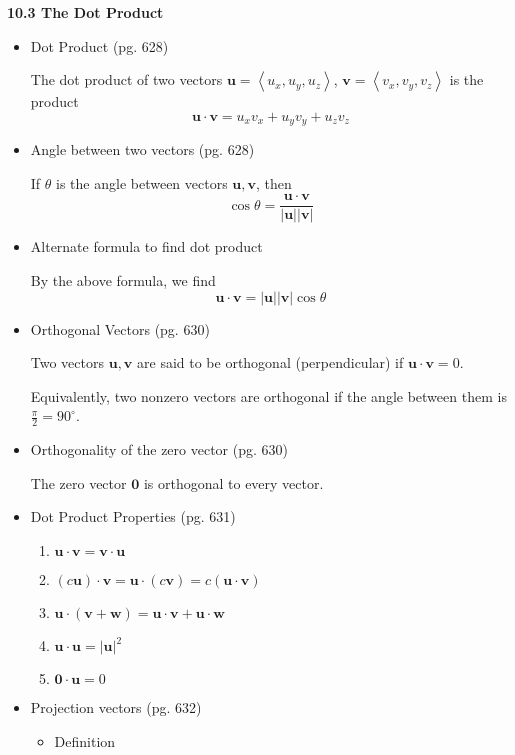 \documentclass[12pt]{article}
\theoremstyle{plain}
\theoremstyle{definition}
\theoremstyle{remark}
\newcommand{\vect}[1]{\mathbf{#1}}
\begin{document}
\newpage
	
\centerline{\bf 10.3 The Dot Product}
	
		\begin{itemize}
		\item Dot Product (pg. 628)
			
		The dot product of two vectors $\vect{u} = \left<u_x,u_y,u_z\right>$, $\vect{v} = \left<v_x,v_y,v_z\right>$ is the product \[ \vect{u} \cdot \vect{v} = u_xv_x + u_yv_y + u_zv_z \]
		\item Angle between two vectors (pg. 628)
			
		If $\theta$ is the angle between vectors $\vect{u},\vect{v}$, then \[\cos\theta = \frac{\vect{u}\cdot\vect{v}}{|\vect{u}||\vect{v}|}\] 
			
		\item Alternate formula to find dot product
			
		By the above formula, we find \[\vect{u} \cdot \vect{v} = |\vect{u}||\vect{v}|\cos \theta \]
			
		\item Orthogonal Vectors (pg. 630)
			
		Two vectors $\vect{u},\vect{v}$ are said to be orthogonal (perpendicular) if $\vect{u} \cdot \vect{v} = 0$. 
			
		Equivalently, two nonzero vectors are orthogonal if the angle between them is $\frac{\pi}{2} = 90^\circ$.
			
		\item Orthogonality of the zero vector (pg. 630)
			
		The zero vector $\vect{0}$ is orthogonal to every vector.
		
		\item Dot Product Properties (pg. 631)
			\begin{enumerate}
			\item $\vect{u} \cdot \vect{v} = \vect{v}\cdot\vect{u}$
			\item $(c\vect{u})\cdot \vect{v} = \vect{u} \cdot (c\vect{v}) = c(\vect{u} \cdot \vect{v})$
			\item $\vect{u} \cdot (\vect{v} + \vect{w}) = \vect{u}\cdot\vect{v} + \vect{u}\cdot \vect{w}$
			\item $\vect{u} \cdot \vect{u} = |\vect{u}|^2$
			\item $\vect{0} \cdot \vect{u} = 0$
			\end{enumerate}
		
		\item Projection vectors (pg. 632)
			\begin{itemize}
			\item Definition
			

\end{itemize}
\end{itemize}
\end{document}
